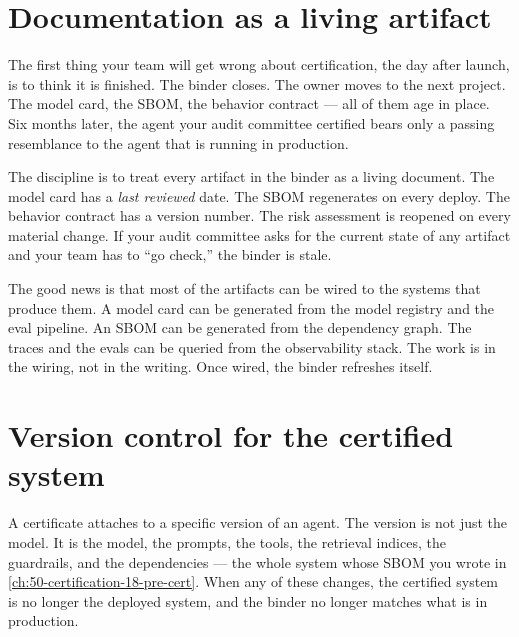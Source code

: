 \label{ch:50-certification-20-keeping-certified}

\starttwocol

\section{Documentation as a living artifact}

The first thing your team will get wrong about certification, the day after launch, is to think it is finished. The binder closes. The owner moves to the next project. The model card, the SBOM, the behavior contract --- all of them age in place. Six months later, the agent your audit committee certified bears only a passing resemblance to the agent that is running in production.

The discipline is to treat every artifact in the binder as a living document. The model card has a \textit{last reviewed} date. The SBOM regenerates on every deploy. The behavior contract has a version number. The risk assessment is reopened on every material change. If your audit committee asks for the current state of any artifact and your team has to ``go check,'' the binder is stale.

The good news is that most of the artifacts can be wired to the systems that produce them. A model card can be generated from the model registry and the eval pipeline. An SBOM can be generated from the dependency graph. The traces and the evals can be queried from the observability stack. The work is in the wiring, not in the writing. Once wired, the binder refreshes itself.

\section{Version control for the certified system}

A certificate attaches to a specific version of an agent. The version is not just the model. It is the model, the prompts, the tools, the retrieval indices, the guardrails, and the dependencies --- the whole system whose SBOM you wrote in \autoref{ch:50-certification-18-pre-cert}. When any of these changes, the certified system is no longer the deployed system, and the binder no longer matches what is in production.

